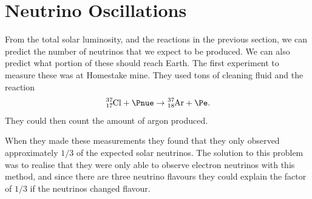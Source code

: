 \documentclass[fleqn]{NotesClass}
\begin{document}
    \section{Neutrino Oscillations}
    From the total solar luminosity, and the reactions in the previous section, we can predict the number of neutrinos that we expect to be produced.
    We can also predict what portion of these should reach Earth.
    The first experiment to measure these was at Homestake mine.
    They used tons of cleaning fluid and the reaction
    \begin{equation}
        \ce{^37_17Cl} + \Pnue \to \ce{^37_18Ar} + \Pe.
    \end{equation}
    They could then count the amount of argon produced.
    
    When they made these measurements they found that they only observed approximately \(1/3\) of the expected solar neutrinos.
    The solution to this problem was to realise that they were only able to observe electron neutrinos with this method, and since there are three neutrino flavours they could explain the factor of \(1/3\) if the neutrinos changed flavour.
    
\end{document}
